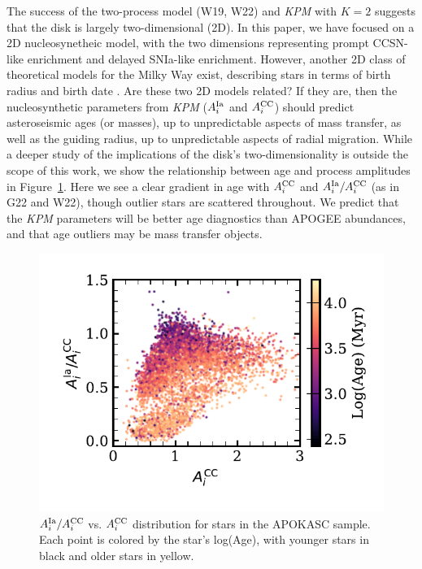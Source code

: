 \documentclass[modern]{aastex631}
\newcommand{\Acc}{A^{\rm CC}_{i}}
\newcommand{\AIa}{A^{\rm Ia}_{i}}
\newcommand{\name}{\textsl{KPM}}
\begin{document}
The success of the two-process model (W19, W22) and \name{} with $K=2$ suggests that the disk is largely two-dimensional (2D). In this paper, we have focused on a 2D nucleosynetheic model, with the two dimensions representing prompt CCSN-like enrichment and delayed SNIa-like enrichment. However, another 2D class of theoretical models for the Milky Way exist, describing stars in terms of birth radius and birth date \citep[e.g.,][]{frankel2018, ness2022}. Are these two 2D models related? If they are, then the nucleosynthetic parameters from \name{} ($\AIa$ and $\Acc$) should predict asteroseismic ages (or masses), up to unpredictable aspects of mass transfer, as well as the guiding radius, up to unpredictable aspects of radial migration. While a deeper study of the implications of the disk's two-dimensionality is outside the scope of this work, we show the relationship between age and process amplitudes in Figure~\ref{fig:age}. Here we see a clear gradient in age with $\Acc$ and $\AIa/\Acc$ (as in G22 and W22), though outlier stars are scattered throughout. We predict that the \name{} parameters will be better age diagnostics than APOGEE abundances, and that age outliers may be mass transfer objects. 

\begin{figure}[htb!]
    \centering
    \includegraphics[width=.6\textwidth]{Paper/Figures/AIaAcc_age.pdf}
    \caption{$\AIa/\Acc$ vs. $\Acc$ distribution for stars in the APOKASC sample. Each point is colored by the star's log(Age), with younger stars in black and older stars in yellow.
    \label{fig:age}}
\end{figure}
\end{document}
